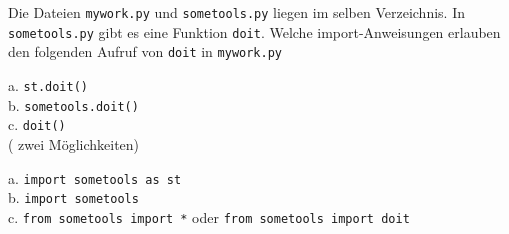 \question[3]  Die Dateien \texttt{mywork.py} und \texttt{sometools.py}
liegen im selben Verzeichnis. In \texttt{sometools.py} gibt es eine Funktion \texttt{doit}.
Welche import-Anweisungen erlauben den folgenden Aufruf von \texttt{doit} in \texttt{mywork.py}

a. \texttt{st.doit()} \\
b. \texttt{sometools.doit()} \\
c. \texttt{doit()}    \\  ( zwei Möglichkeiten)
\begin{solutionbox}{5cm}

a. \texttt{import sometools as st} \\
b. \texttt{import sometools}  \\
c.  \texttt{from sometools import *}   oder  \texttt{from sometools import doit}
\end{solutionbox}
